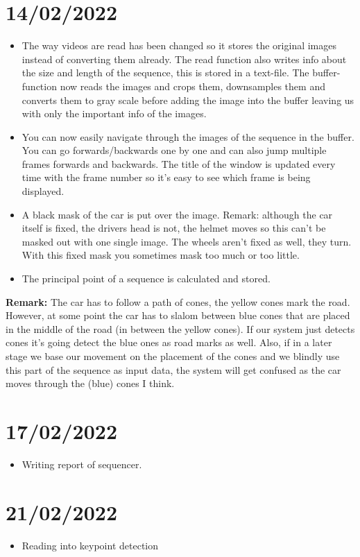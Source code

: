 \section{14/02/2022}
\begin{itemize}
    \item The way videos are read has been changed so it stores the original images instead of converting them already. The read function also writes info about the size and length of the sequence, this is stored in a text-file. The buffer-function now reads the images and crops them, downsamples them and converts them to gray scale before adding the image into the buffer leaving us with only the important info of the images.
    \item You can now easily navigate through the images of the sequence in the buffer. You can go forwards/backwards one by one and can also jump multiple frames forwards and backwards. The title of the window is updated every time with the frame number so it's easy to see which frame is being displayed.
    \item A black mask of the car is put over the image. Remark: although the car itself is fixed, the drivers head is not, the helmet moves so this can't be masked out with one single image. The wheels aren't fixed as well, they turn. With this fixed mask you sometimes mask too much or too little.
    \item The principal point of a sequence is calculated and stored. 
\end{itemize}
\textbf{Remark: }The car has to follow a path of cones, the yellow cones mark the road. However, at some point the car has to slalom between blue cones that are placed in the middle of the road (in between the yellow cones). If our system just detects cones it's going detect the blue ones as road marks as well. Also, if in a later stage we base our movement on the placement of the cones and we blindly use this part of the sequence as input data, the system will get confused as the car moves through the (blue) cones I think.

\section{17/02/2022}
\begin{itemize}
    \item Writing report of sequencer.
\end{itemize}

\section{21/02/2022}
\begin{itemize}
    \item Reading into keypoint detection
\end{itemize}

